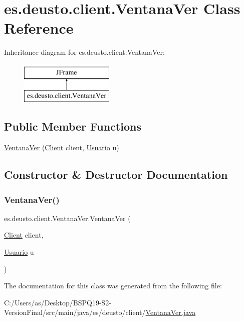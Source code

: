 \hypertarget{classes_1_1deusto_1_1client_1_1_ventana_ver}{}\section{es.\+deusto.\+client.\+Ventana\+Ver Class Reference}
\label{classes_1_1deusto_1_1client_1_1_ventana_ver}
Inheritance diagram for es.\+deusto.\+client.\+Ventana\+Ver\+:\begin{figure}[H]
\begin{center}
\leavevmode
\includegraphics[height=2.000000cm]{classes_1_1deusto_1_1client_1_1_ventana_ver}
\end{center}
\end{figure}
\subsection*{Public Member Functions}
\begin{DoxyCompactItemize}
\item 
\mbox{\hyperlink{classes_1_1deusto_1_1client_1_1_ventana_ver_ac53c302eabef4830a1c0fa0831e3cff8}{Ventana\+Ver}} (\mbox{\hyperlink{classes_1_1deusto_1_1client_1_1_client}{Client}} client, \mbox{\hyperlink{classes_1_1deusto_1_1server_1_1jdo_1_1_usuario}{Usuario}} u)
\end{DoxyCompactItemize}


\subsection{Constructor \& Destructor Documentation}
\mbox{\label{classes_1_1deusto_1_1client_1_1_ventana_ver_ac53c302eabef4830a1c0fa0831e3cff8}} 
\subsubsection{\texorpdfstring{VentanaVer()}{VentanaVer()}}
{\footnotesize\ttfamily es.\+deusto.\+client.\+Ventana\+Ver.\+Ventana\+Ver (\begin{DoxyParamCaption}\item[{\mbox{\hyperlink{classes_1_1deusto_1_1client_1_1_client}{Client}}}]{client,  }\item[{\mbox{\hyperlink{classes_1_1deusto_1_1server_1_1jdo_1_1_usuario}{Usuario}}}]{u }\end{DoxyParamCaption})}



The documentation for this class was generated from the following file\+:\begin{DoxyCompactItemize}
\item 
C\+:/\+Users/as/\+Desktop/\+B\+S\+P\+Q19-\/\+S2-\/\+Version\+Final/src/main/java/es/deusto/client/\mbox{\hyperlink{_ventana_ver_8java}{Ventana\+Ver.\+java}}\end{DoxyCompactItemize}
